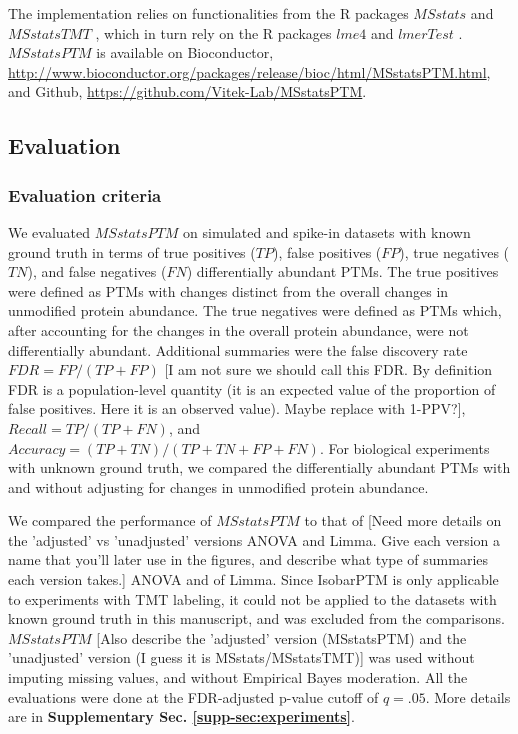 \documentclass[mcp]{article}
\numberwithin{table}{section}
\def\todo#1{{\color{red}[#1]}}
\begin{document}
The implementation relies on functionalities from the R packages $MSstats$ \cite{Choi:2014} and $MSstatsTMT$ \cite{Huang:2020}, which in turn rely on the R packages $lme4$ \cite{Bates2015} and $lmerTest$ \cite{Kuznetsova2017}. $MSstatsPTM$ is available on Bioconductor, \url{http://www.bioconductor.org/packages/release/bioc/html/MSstatsPTM.html}, and Github, \url{https://github.com/Vitek-Lab/MSstatsPTM}.

\subsection*{Evaluation}

\subsubsection*{Evaluation criteria}

We evaluated $MSstatsPTM$ on simulated and spike-in datasets with known ground truth in terms of true positives ($TP$), false positives ($FP$), true negatives ($TN$), and false negatives ($FN$) differentially abundant PTMs. The true positives were defined as PTMs with changes distinct from the overall changes in unmodified protein abundance. The true negatives were defined as PTMs which, after accounting for the changes in the overall protein abundance, were not differentially abundant. Additional summaries were the false discovery rate $FDR=FP/(TP+FP)$ \todo{I am not sure we should call this FDR. By definition FDR is a population-level quantity (it is an expected value of the proportion of false positives. Here it is an observed value). Maybe replace with 1-PPV?}, $Recall=TP/(TP + FN)$, and $Accuracy=(TP + TN) / (TP + TN + FP + FN)$.
For biological experiments with unknown ground truth, we compared the differentially abundant PTMs with and without adjusting for changes in unmodified protein abundance. 

We compared the performance of  $MSstatsPTM$ to that of \todo{Need more details on the 'adjusted' vs 'unadjusted' versions ANOVA and Limma. Give each version a name that you'll later use in the figures, and describe what type of summaries each version takes.} ANOVA and of Limma. Since IsobarPTM is only applicable to experiments with TMT labeling, it could not be applied to the datasets with known ground truth in this manuscript, and was excluded from the comparisons.  $MSstatsPTM$ \todo{Also describe the 'adjusted' version (MSstatsPTM) and the 'unadjusted' version (I guess it is MSstats/MSstatsTMT)} was used without imputing missing values, and without Empirical Bayes moderation. All the evaluations were done at the FDR-adjusted p-value cutoff of $q=.05$. More details are in {\bf Supplementary Sec. \ref{supp-sec:experiments}}. 
\end{document}

